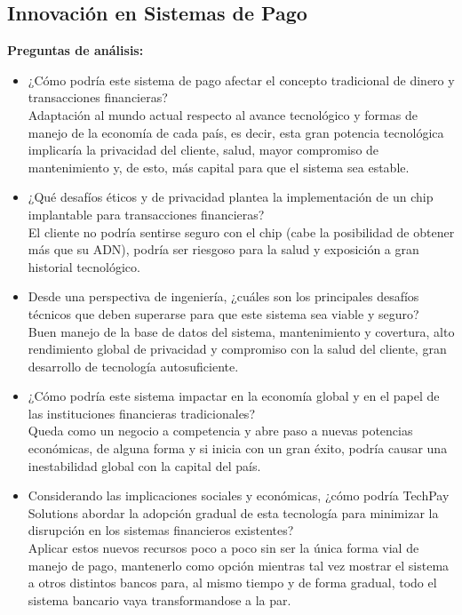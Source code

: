 \documentclass[letterpaper,12pt]{article}
\begin{document}
\begin{sloppypar}
\subsection{Innovación en Sistemas de Pago}
\textbf{Preguntas de análisis:}
\begin{itemize}
    \item ¿Cómo podría este sistema de pago afectar el concepto tradicional de dinero y transacciones financieras?\\ Adaptación al mundo actual respecto al avance tecnológico y formas de manejo de la economía de cada país, es decir, esta gran potencia tecnológica implicaría la privacidad del cliente, salud, mayor compromiso de mantenimiento y, de esto, más capital para que el sistema sea estable.
    \item ¿Qué desafíos éticos y de privacidad plantea la implementación de un chip implantable para transacciones financieras? \\ El cliente no podría sentirse seguro con el chip (cabe la posibilidad de obtener más que su ADN), podría ser riesgoso para la salud y exposición a gran historial tecnológico.
    \item Desde una perspectiva de ingeniería, ¿cuáles son los principales desafíos técnicos que deben superarse para que este sistema sea viable y seguro? \\ Buen manejo de la base de datos del sistema, mantenimiento y covertura, alto rendimiento global de privacidad y compromiso con la salud del cliente, gran desarrollo de tecnología autosuficiente.
    \item ¿Cómo podría este sistema impactar en la economía global y en el papel de las instituciones financieras tradicionales? \\ Queda como un negocio a competencia y abre paso a nuevas potencias económicas, de alguna forma y si inicia con un gran éxito, podría causar una inestabilidad global con la capital del país.
    \item Considerando las implicaciones sociales y económicas, ¿cómo podría TechPay Solutions abordar la adopción gradual de esta tecnología para minimizar la disrupción en los sistemas financieros existentes? \\ Aplicar estos nuevos recursos poco a poco sin ser la única forma vial de manejo de pago, mantenerlo como opción mientras tal vez mostrar el sistema a otros distintos bancos para, al mismo tiempo y de forma gradual, todo el sistema bancario vaya transformandose a la par.
\end{itemize}
\newpage

\end{sloppypar}
\end{document}
